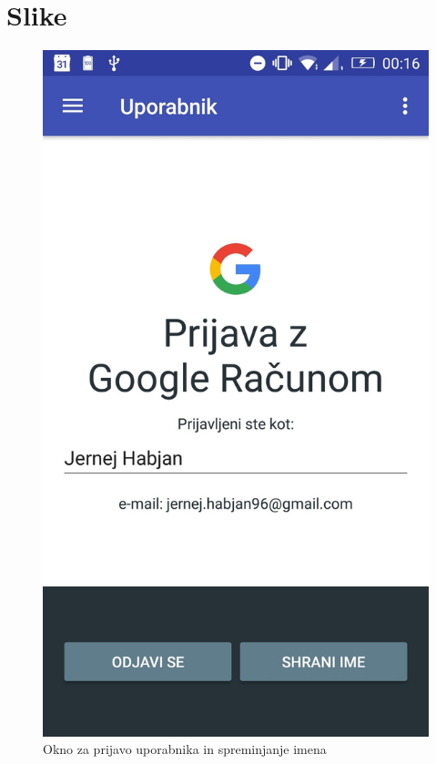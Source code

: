 \documentclass[11pt,a4paper]{article}
\begin{document}
\section{Slike}

\begin{figure}[htb]
\centerline{\includegraphics[width=1.0\textwidth]{loginScreen.jpg}}
\caption{Okno za prijavo uporabnika in spreminjanje imena}
\label{sl:koncept}
\end{figure}
\end{document}

